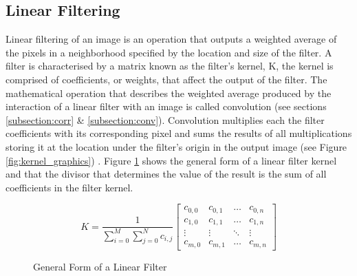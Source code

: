 \subsection{Linear Filtering}

Linear filtering of an image is an operation that outputs a weighted average of the pixels in a neighborhood specified by the location and size of the filter. A filter is characterised by a matrix known as the filter's kernel, K, the kernel is comprised of coefficients, or weights, that affect the output of the filter. The mathematical operation that describes the weighted average produced by the interaction of a linear filter with an image is called convolution (see sections \ref{subsection:corr} \& \ref{subsection:conv}). Convolution multiplies each the filter coefficients with its corresponding pixel and sums the results of all multiplications storing it at the location under the filter's origin in the output image (see Figure \ref{fig:kernel_graphics}) \cite{alg_apps}. Figure \ref{fig:generalForm} shows the general form of a linear filter kernel and that the divisor that determines the value of the result is the sum of all coefficients in the filter kernel.

\begin{figure}[h]
  
   \[ 
     K  = \frac{1}{\sum\limits_{i=0}^{M}\sum\limits_{j=0}^{N}c_{i,j}}
    \begin{bmatrix}
      c_{0,0} & c_{0,1} & \dots & c_{0,n} \\
      c_{1,0} & c_{1,1} & \dots & c_{1,n} \\
      \vdots & \vdots & \ddots & \vdots \\
      c_{m,0} & c_{m,1} & \dots & c_{m,n}
    \end{bmatrix}
  \]
  \caption{General Form of a Linear Filter}
  \label{fig:generalForm}
\end{figure}











